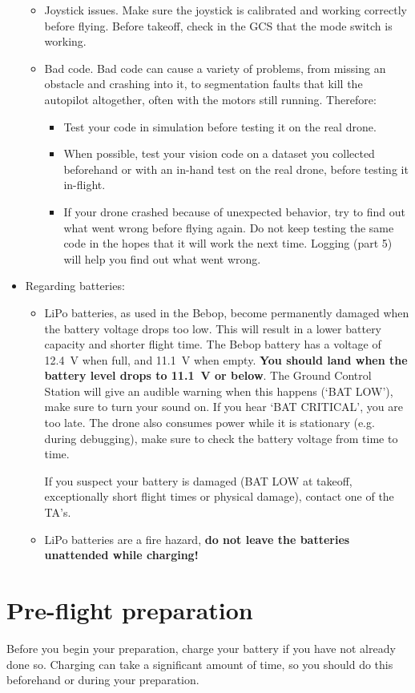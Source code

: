 \begin{itemize}
\begin{itemize}
		\item Joystick issues. Make sure the joystick is calibrated and working correctly before flying. Before takeoff, check in the GCS that the mode switch is working.
		\item Bad code. Bad code can cause a variety of problems, from missing an obstacle and crashing into it, to segmentation faults that kill the autopilot altogether, often with the motors still running. Therefore:
		\begin{itemize}
			\item Test your code in simulation before testing it on the real drone.
			\item When possible, test your vision code on a dataset you collected beforehand or with an in-hand test on the real drone, before testing it in-flight.
			\item If your drone crashed because of unexpected behavior, try to find out what went wrong before flying again. Do not keep testing the same code in the hopes that it will work the next time. Logging (part 5) will help you find out what went wrong.
		\end{itemize}
	\end{itemize}
	\item Regarding batteries:
	\begin{itemize}
		\item{LiPo batteries, as used in the Bebop, become permanently damaged when the battery voltage drops too low. This will result in a lower battery capacity and shorter flight time. The Bebop battery has a voltage of 12.4~V when full, and 11.1~V when empty. \textbf{You should land when the battery level drops to 11.1~V or below}. The Ground Control Station will give an audible warning when this happens (`BAT LOW'), make sure to turn your sound on. If you hear `BAT CRITICAL', you are too late. The drone also consumes power while it is stationary (e.g. during debugging), make sure to check the battery voltage from time to time.
		
		If you suspect your battery is damaged (BAT LOW at takeoff, exceptionally short flight times or physical damage), contact one of the TA's.}
		
		\item{LiPo batteries are a fire hazard, \textbf{do not leave the batteries unattended while charging!}}
	\end{itemize}
\end{itemize}

\section{Pre-flight preparation}
Before you begin your preparation, charge your battery if you have not already done so. Charging can take a significant amount of time, so you should do this beforehand or during your preparation.

